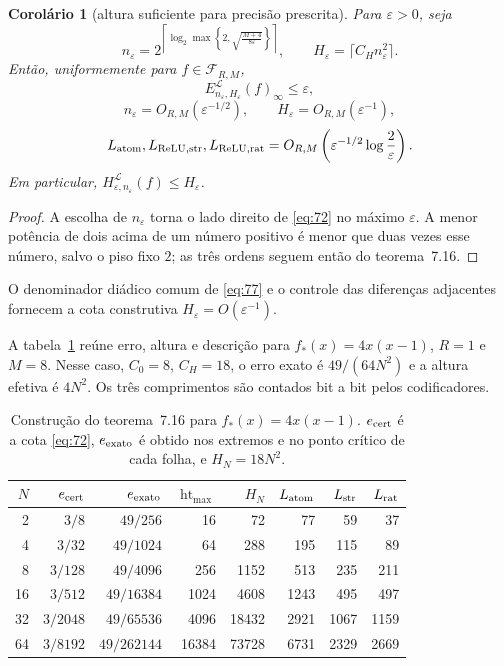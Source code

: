 \documentclass[11pt,a4paper]{article}
\theoremstyle{preciso}
\newtheorem{corolario}[teorema]{Corolário}
\theoremstyle{definition}
\newcommand{\LL}{\mathcal L}
\newcommand{\FF}{\mathcal F}
\newcommand{\heightq}{\operatorname{ht}}
\newcommand{\eqn}[2]{\begin{equation}\label{eq:#1}#2\end{equation}}
\begin{document}
\begin{corolario}[altura suficiente para precisão prescrita]
Para $\varepsilon>0$, seja
\eqn{82}{n_\varepsilon=
2^{\left\lceil\log_2\max\left\{2,\sqrt{\frac{M+4}{8\varepsilon}}\right\}\right\rceil},
\qquad H_\varepsilon=\lceil C_Hn_\varepsilon^2\rceil.}
Então, uniformemente para $f\in\FF_{R,M}$,
\eqn{83}{E^{\LL}_{n_\varepsilon,H_\varepsilon}(f)_\infty\le\varepsilon,}
\eqn{84}{n_\varepsilon=O_{R,M}(\varepsilon^{-1/2}),\qquad
H_\varepsilon=O_{R,M}(\varepsilon^{-1}),}
\eqn{85}{L_{\rm atom},L_{\rm ReLU,str},L_{\rm ReLU,rat}
=O_{R,M}\left(\varepsilon^{-1/2}\log\frac2\varepsilon\right).}
Em particular, $H^{\LL}_{\varepsilon,n_\varepsilon}(f)\le H_\varepsilon$.
\end{corolario}
\begin{proof}
A escolha de $n_\varepsilon$ torna o lado direito de \eqref{eq:72} no máximo $\varepsilon$. A menor potência de dois acima de um número positivo é menor que duas vezes esse número, salvo o piso fixo $2$; as três ordens seguem então do teorema~7.16.
\end{proof}
O denominador diádico comum de \eqref{eq:77} e o controle das diferenças adjacentes fornecem a cota construtiva $H_\varepsilon=O(\varepsilon^{-1})$.

A tabela~\ref{tab:bits} reúne erro, altura e descrição para $f_*(x)=4x(x-1)$, $R=1$ e $M=8$. Nesse caso, $C_0=8$, $C_H=18$, o erro exato é $49/(64N^2)$ e a altura efetiva é $4N^2$. Os três comprimentos são contados bit a bit pelos codificadores.
\begin{table}[!htbp]\centering
\caption{Construção do teorema~7.16 para $f_*(x)=4x(x-1)$. $e_{\rm cert}$ é a cota \eqref{eq:72}, $e_{\rm exato}$ é obtido nos extremos e no ponto crítico de cada folha, e $H_N=18N^2$.}\label{tab:bits}
\small\renewcommand{\arraystretch}{1.4}
\begin{tabular}{rrrrrrrr}\toprule
$N$&$e_{\rm cert}$&$e_{\rm exato}$&$\heightq_{\max}$&$H_N$&$L_{\rm atom}$&$L_{\rm str}$&$L_{\rm rat}$\\\midrule
2&$3/8$&$49/256$&16&72&77&59&37\\
4&$3/32$&$49/1024$&64&288&195&115&89\\
8&$3/128$&$49/4096$&256&1152&513&235&211\\
16&$3/512$&$49/16384$&1024&4608&1243&495&497\\
32&$3/2048$&$49/65536$&4096&18432&2921&1067&1159\\
64&$3/8192$&$49/262144$&16384&73728&6731&2329&2669\\\bottomrule
\end{tabular}
\end{table}
\end{document}
